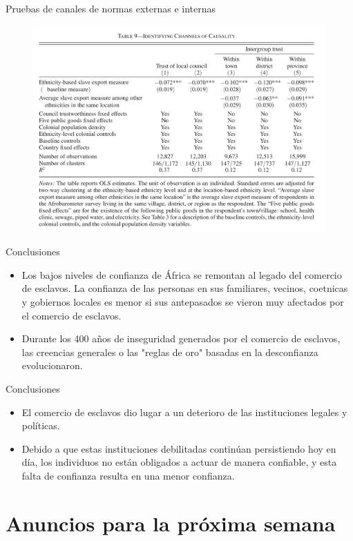 \documentclass[11pt, aspectratio=169, compress]{beamer}
\begin{document}
\begin{frame}{Pruebas de canales de normas externas e internas}
	\begin{figure}[htb]
		\centering
		\includegraphics[width=.7\textwidth]{tab9}
	\end{figure}
\end{frame}
\begin{frame}{Conclusiones}
	\begin{itemize}
		\item Los bajos niveles de confianza de África se remontan al legado del comercio de esclavos. La confianza de las personas en sus familiares, vecinos, coetnicas y gobiernos locales es menor si sus antepasados se vieron muy afectados por el comercio de esclavos.
		\item Durante los 400 años de inseguridad generados por el comercio de esclavos, las creencias generales o las "reglas de oro" basadas en la desconfianza evolucionaron.
	\end{itemize}
\end{frame}
\begin{frame}{Conclusiones}
	\begin{itemize}
		\item El comercio de esclavos dio lugar a un deterioro de las instituciones legales y políticas.
		\item Debido a que estas instituciones debilitadas continúan persistiendo hoy en día, los individuos no están obligados a actuar de manera confiable, y esta falta de confianza resulta en una menor confianza.
	\end{itemize}
\end{frame}
\section{Anuncios para la próxima semana}
\end{document}
